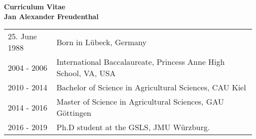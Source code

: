 \noindent
\begin{center}
  {\Huge\textbf{Curriculum Vitae} \\
    \vspace{.5cm}
    \textbf{Jan Alexander Freudenthal}} \\
\end{center}
\vspace{.5cm}
\begin{tabular}{ll}
  25. June 1988  & Born in L\"{u}beck, Germany  \\
  2004 - 2006    & International Baccalaureate, Princess Anne High School, VA, USA\\
  2010 - 2014    & Bachelor of Science in Agricultural Sciences, CAU Kiel \\
  2014 - 2016    & Master of Science in Agricultural Sciences, GAU G\"{o}ttingen \\
  2016 - 2019    & Ph.D student at the GSLS, JMU W\"{u}rzburg.
                   
 \end{tabular}





